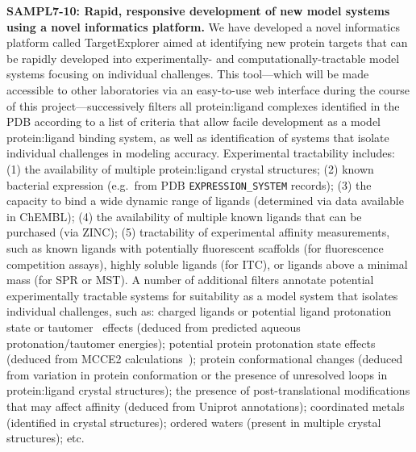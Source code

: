 \documentclass[11pt]{article}
\begin{document}
{\bf SAMPL7-10: Rapid, responsive development of new model systems using a novel informatics platform.}
We have developed a novel informatics platform called TargetExplorer 
aimed at identifying new protein targets that can be rapidly developed into experimentally- and computationally-tractable model systems focusing on individual challenges.
This tool---which will be made accessible to other laboratories via an easy-to-use web interface during the course of this project---successively filters all protein:ligand complexes identified in the PDB according to a list of criteria that allow facile development as a model protein:ligand binding system, as well as identification of systems that isolate individual challenges in modeling accuracy.
Experimental tractability includes: (1) the availability of multiple protein:ligand crystal structures; (2) known bacterial expression (e.g.~from PDB {\tt EXPRESSION\_SYSTEM} records); (3) the capacity to bind a wide dynamic range of ligands (determined via data available in ChEMBL); (4) the availability of multiple known ligands that can be purchased (via ZINC); (5) tractability of experimental affinity measurements, such as known ligands with potentially fluorescent scaffolds (for fluorescence competition assays), highly soluble ligands (for ITC), or ligands above a minimal mass (for SPR or MST).
A number of additional filters annotate potential experimentally tractable systems for suitability as a model system that isolates individual challenges, such as: charged ligands or potential ligand protonation state or tautomer~\cite{Martin:2009:JournalofComputer-AidedMolecularDesign} effects (deduced from predicted aqueous protonation/tautomer energies); potential protein protonation state effects (deduced from MCCE2 calculations~\cite{Song:2009:JournalofComputationalChemistry}); protein conformational changes (deduced from variation in protein conformation or the presence of unresolved loops in protein:ligand crystal structures); the presence of post-translational modifications that may affect affinity (deduced from Uniprot annotations); coordinated metals (identified in crystal structures); ordered waters (present in multiple crystal structures); etc.
\end{document}
